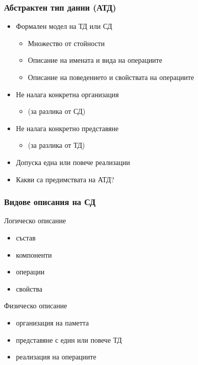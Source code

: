 \documentclass{beamer}
\begin{document}
\begin{frame}
  \frametitle{Абстрактен тип данни (АТД)}

  \begin{itemize}[<+->]
  \item Формален модел на ТД или СД
    \begin{itemize}
    \item Множество от стойности
    \item Описание на имената и вида на операциите
    \item Описание на поведението и свойствата на операциите
    \end{itemize}
  \item Не налага конкретна организация
    \begin{itemize}
    \item (за разлика от СД)
    \end{itemize}
  \item Не налага конкретно представяне
    \begin{itemize}
    \item (за разлика от ТД)
    \end{itemize}
  \item Допуска една или повече реализации
  \item \alert{Какви са предимствата на АТД?}
  \end{itemize}
\end{frame}

\begin{frame}
  \frametitle{Видове описания на СД}

  Логическо описание
  \begin{itemize}
  \item състав
  \item компоненти
  \item операции
  \item свойства
  \end{itemize}
  \vspace{1em}

  Физическо описание
  \begin{itemize}
  \item организация на паметта
  \item представяне с един или повече ТД
  \item реализация на операциите
  \end{itemize}
\end{frame}
\end{document}
